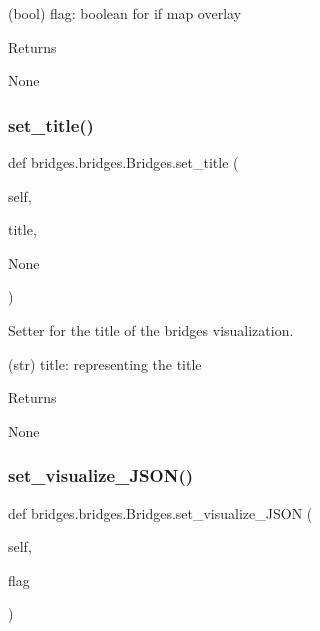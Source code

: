 (bool) flag\+: boolean for if map overlay \begin{DoxyReturn}{Returns}


None 
\end{DoxyReturn}
\mbox{\label{classbridges_1_1bridges_1_1_bridges_a3b0c629c1ae0beaac05fa9d90846c423}} 
\subsubsection{\texorpdfstring{set\+\_\+title()}{set\_title()}}
{\footnotesize\ttfamily def bridges.\+bridges.\+Bridges.\+set\+\_\+title (\begin{DoxyParamCaption}\item[{}]{self,  }\item[{}]{title,  }\item[{}]{None }\end{DoxyParamCaption})}



Setter for the title of the bridges visualization. 

(str) title\+: representing the title \begin{DoxyReturn}{Returns}


None 
\end{DoxyReturn}
\mbox{\label{classbridges_1_1bridges_1_1_bridges_ab50d018b5178ca33de24157b7b6de285}} 
\subsubsection{\texorpdfstring{set\+\_\+visualize\+\_\+\+J\+S\+O\+N()}{set\_visualize\_JSON()}}
{\footnotesize\ttfamily def bridges.\+bridges.\+Bridges.\+set\+\_\+visualize\+\_\+\+J\+S\+ON (\begin{DoxyParamCaption}\item[{}]{self,  }\item[{}]{flag }\end{DoxyParamCaption})}

